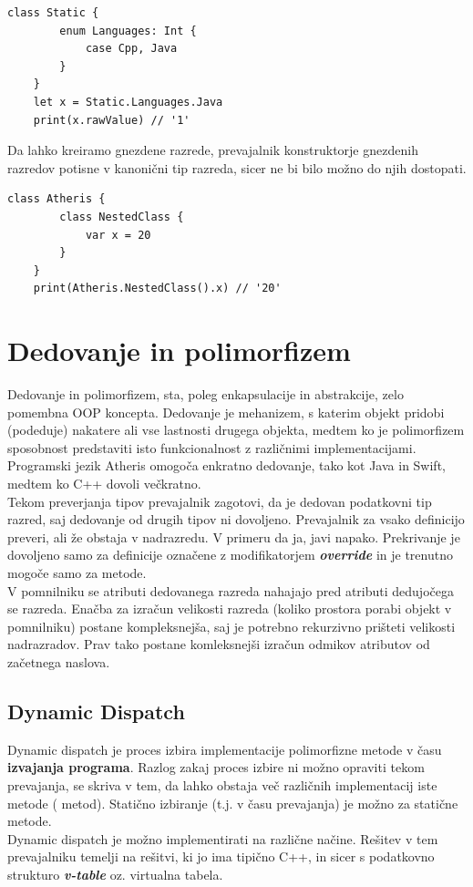 \documentclass[a4paper, 12pt]{book}
\begin{document}
\begin{lstlisting}[caption={Enumeracija znotraj razreda}, captionpos=b]
	class Static {
	    enum Languages: Int {
	        case Cpp, Java
	    }
	}
	let x = Static.Languages.Java
	print(x.rawValue) // '1'
\end{lstlisting}

Da lahko kreiramo gnezdene razrede, prevajalnik konstruktorje gnezdenih razredov potisne v kanonični tip razreda, sicer ne bi bilo možno do njih dostopati. 

\begin{lstlisting}[caption={Gnezden razred}, captionpos=b]
	class Atheris {
	    class NestedClass {
	        var x = 20
	    }
	}
	print(Atheris.NestedClass().x) // '20'
\end{lstlisting}

\section{Dedovanje in polimorfizem}

Dedovanje in polimorfizem, sta, poleg enkapsulacije in abstrakcije, zelo pomembna OOP koncepta. Dedovanje je mehanizem, s katerim objekt pridobi (podeduje) nakatere ali vse lastnosti drugega objekta, medtem ko je polimorfizem sposobnost predstaviti isto funkcionalnost z različnimi implementacijami. Programski jezik Atheris omogoča enkratno dedovanje, tako kot Java in Swift, medtem ko C++ dovoli večkratno. \\ 
\indent Tekom preverjanja tipov prevajalnik zagotovi, da je dedovan podatkovni tip razred, saj dedovanje od drugih tipov ni dovoljeno. Prevajalnik za vsako definicijo preveri, ali že obstaja v nadrazredu. V primeru da ja, javi napako. Prekrivanje je dovoljeno samo za definicije označene z modifikatorjem \textit{\textbf{override}} in je trenutno mogoče samo za metode. \\
\indent V pomnilniku se atributi dedovanega razreda nahajajo pred atributi dedujočega se razreda. Enačba za izračun velikosti razreda (koliko prostora porabi objekt v pomnilniku) postane kompleksnejša, saj je potrebno rekurzivno prišteti velikosti nadrazradov. Prav tako postane komleksnejši izračun odmikov atributov od začetnega naslova. 

\subsection{Dynamic Dispatch}

Dynamic dispatch je proces izbira implementacije polimorfizne metode v času \textbf{izvajanja programa}. Razlog zakaj proces izbire ni možno opraviti tekom prevajanja, se skriva v tem, da lahko obstaja več različnih implementacij iste metode ( metod). Statično izbiranje (t.j. v času prevajanja) je možno za statične metode. \\
\indent Dynamic dispatch je možno implementirati na različne načine. Rešitev v tem prevajalniku temelji na rešitvi, ki jo ima tipično C++, in sicer s podatkovno strukturo \textit{\textbf{v-table}} oz. virtualna tabela. 
\end{document}
